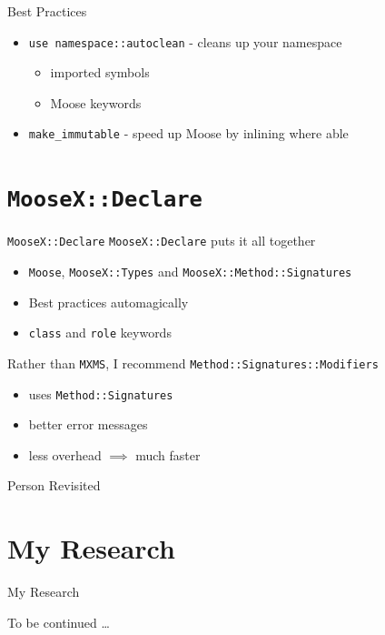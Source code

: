 \documentclass[mathserif]{beamer}
\providecommand{\code}[1]{{\texttt{\scriptsize{#1}}}}
\providecommand{\inputcode}[1]{
  \begin{block}{}
    \scriptsize{}
  \end{block}
}
\begin{document}
\begin{frame}{Best Practices}
  \begin{itemize}
    \item \code{use namespace::autoclean} - cleans up your namespace
    \begin{itemize}
      \item imported symbols
      \item Moose keywords
    \end{itemize}
    \item \code{make\_immutable} - speed up Moose by inlining where able
  \end{itemize}
  \inputcode{moose/best-practices}
\end{frame}

\section{\code{MooseX::Declare}}

\begin{frame}{\texttt{MooseX::Declare}}
  \code{MooseX::Declare} puts it all together
  \begin{itemize}
    \item \code{Moose}, \code{MooseX::Types} and \code{MooseX::Method::Signatures}
    \item Best practices automagically
    \item \code{class} and \code{role} keywords
  \end{itemize}
  \vfill
  Rather than \code{MXMS}, I recommend \code{Method::Signatures::Modifiers}
    \begin{itemize}
      \item uses \code{Method::Signatures}
      \item better error messages
      \item less overhead $\implies$ much faster
    \end{itemize}
\end{frame}

\begin{frame}{Person Revisited}
  \inputcode{mxd/person}
\end{frame}

\section{My Research}

\begin{frame}{My Research}
  \begin{block}{}
    To be continued \ldots
  \end{block}
\end{frame}
\end{document}

